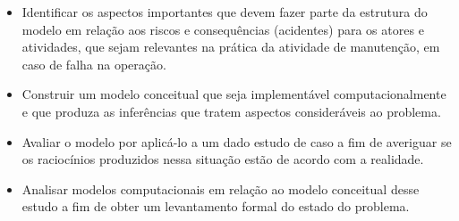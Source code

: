 \begin{itemize}
    \item Identificar os aspectos importantes que devem fazer parte da estrutura do modelo em relação aos riscos e consequências (acidentes) para os atores e atividades, que sejam relevantes na prática da atividade de manutenção, em caso de falha na operação. 
    \item Construir um modelo conceitual que seja implementável computacionalmente e que produza as inferências que tratem aspectos consideráveis ao problema.
    \item Avaliar o modelo por aplicá-lo a um dado estudo de caso a fim de averiguar se os raciocínios produzidos nessa situação estão de acordo com a realidade.  
    \item Analisar modelos computacionais em relação ao modelo conceitual desse estudo a fim de obter um levantamento formal do estado do problema.
\end{itemize}